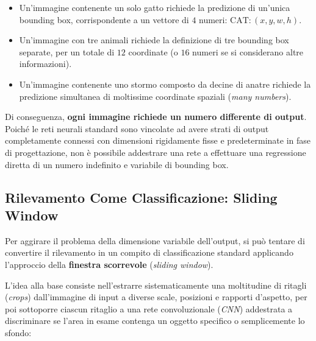 ﻿\documentclass[11pt, a4paper]{article}
\begin{document}

\begin{itemize}[noitemsep]
    \item Un'immagine contenente un solo gatto richiede la predizione di un'unica bounding box, corrispondente a un vettore di $4$ numeri: $\text{CAT}: (x, y, w, h)$.
    \item Un'immagine con tre animali richiede la definizione di tre bounding box separate, per un totale di $12$ coordinate (o $16$ numeri se si considerano altre informazioni).
    \item Un'immagine contenente uno stormo composto da decine di anatre richiede la predizione simultanea di moltissime coordinate spaziali (\emph{many numbers}).
\end{itemize}

Di conseguenza, \textbf{ogni immagine richiede un numero differente di output}. Poiché le reti neurali standard sono vincolate ad avere strati di output completamente connessi con dimensioni rigidamente fisse e predeterminate in fase di progettazione, non è possibile addestrare una rete a effettuare una regressione diretta di un numero indefinito e variabile di bounding box.

\newpage

\subsection{Rilevamento Come Classificazione: Sliding Window}

Per aggirare il problema della dimensione variabile dell'output, si può tentare di convertire il rilevamento in un compito di classificazione standard applicando l'approccio della \textbf{finestra scorrevole} (\emph{sliding window}).

L'idea alla base consiste nell'estrarre sistematicamente una moltitudine di ritagli (\emph{crops}) dall'immagine di input a diverse scale, posizioni e rapporti d'aspetto, per poi sottoporre ciascun ritaglio a una rete convoluzionale (\emph{CNN}) addestrata a discriminare se l'area in esame contenga un oggetto specifico o semplicemente lo sfondo:

\end{document}
